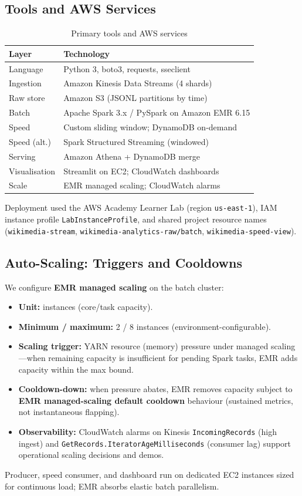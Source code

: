 \documentclass[conference]{IEEEtran}
\begin{document}
\subsection{Tools and AWS Services}
\begin{table}[t]
\centering
\caption{Primary tools and AWS services}
\label{tab:tools}
\small
\begin{tabular}{@{}ll@{}}
\toprule
\textbf{Layer} & \textbf{Technology} \\
\midrule
Language & Python 3, boto3, requests, sseclient \\
Ingestion & Amazon Kinesis Data Streams (4 shards) \\
Raw store & Amazon S3 (JSONL partitions by time) \\
Batch & Apache Spark 3.x / PySpark on Amazon EMR 6.15 \\
Speed & Custom sliding window; DynamoDB on-demand \\
Speed (alt.) & Spark Structured Streaming (windowed) \\
Serving & Amazon Athena + DynamoDB merge \\
Visualisation & Streamlit on EC2; CloudWatch dashboards \\
Scale & EMR managed scaling; CloudWatch alarms \\
\bottomrule
\end{tabular}
\end{table}

Deployment used the AWS Academy Learner Lab (region \texttt{us-east-1}), IAM instance profile \texttt{LabInstanceProfile}, and shared project resource names (\texttt{wikimedia-stream}, \texttt{wikimedia-analytics-raw/batch}, \texttt{wikimedia-speed-view}).

\subsection{Auto-Scaling: Triggers and Cooldowns}
We configure \textbf{EMR managed scaling} on the batch cluster:
\begin{itemize}
\item \textbf{Unit:} instances (core/task capacity).
\item \textbf{Minimum / maximum:} 2 / 8 instances (environment-configurable).
\item \textbf{Scaling trigger:} YARN resource (memory) pressure under managed scaling---when remaining capacity is insufficient for pending Spark tasks, EMR adds capacity within the max bound.
\item \textbf{Cooldown-down:} when pressure abates, EMR removes capacity subject to \textbf{EMR managed-scaling default cooldown} behaviour (sustained metrics, not instantaneous flapping).
\item \textbf{Observability:} CloudWatch alarms on Kinesis \texttt{IncomingRecords} (high ingest) and \texttt{GetRecords.IteratorAgeMilliseconds} (consumer lag) support operational scaling decisions and demos.
\end{itemize}
Producer, speed consumer, and dashboard run on dedicated EC2 instances sized for continuous load; EMR absorbs elastic batch parallelism.
\end{document}
